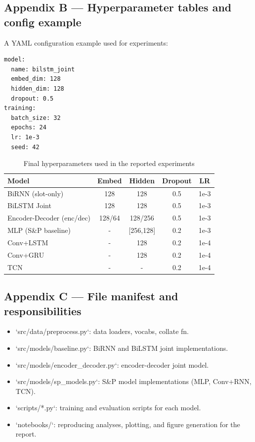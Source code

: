 \documentclass[conference]{IEEEtran}
\begin{document}
\subsection{Appendix B — Hyperparameter tables and config example}
A YAML configuration example used for experiments:
\begin{verbatim}
model:
  name: bilstm_joint
  embed_dim: 128
  hidden_dim: 128
  dropout: 0.5
training:
  batch_size: 32
  epochs: 24
  lr: 1e-3
  seed: 42
\end{verbatim}

\begin{table}[H]
  \centering
  \caption{Final hyperparameters used in the reported experiments}
  \begin{tabular}{lcccc}
  \toprule
  Model & Embed & Hidden & Dropout & LR \\
  \midrule
  BiRNN (slot-only) & 128 & 128 & 0.5 & 1e-3 \\
  BiLSTM Joint & 128 & 128 & 0.5 & 1e-3 \\
  Encoder-Decoder (enc/dec) & 128/64 & 128/256 & 0.5 & 1e-3 \\
  MLP (S\&P baseline) & - & [256,128] & 0.2 & 1e-3 \\
  Conv+LSTM & - & 128 & 0.2 & 1e-4 \\
  Conv+GRU & - & 128 & 0.2 & 1e-4 \\
  TCN & - & - & 0.2 & 1e-4 \\
  \bottomrule
  \end{tabular}
  \label{tab:final-hps}
\end{table}

\subsection{Appendix C — File manifest and responsibilities}
\begin{itemize}
  \item `src/data/preprocess.py`: data loaders, vocabs, collate fn.\
  \item `src/models/baseline.py`: BiRNN and BiLSTM joint implementations.\
  \item `src/models/encoder_decoder.py`: encoder-decoder joint model.\
  \item `src/models/sp_models.py`: S\&P model implementations (MLP, Conv+RNN, TCN).\
  \item `scripts/*.py`: training and evaluation scripts for each model.\
  \item `notebooks/`: reproducing analyses, plotting, and figure generation for the report.\
\end{itemize}
\end{document}
